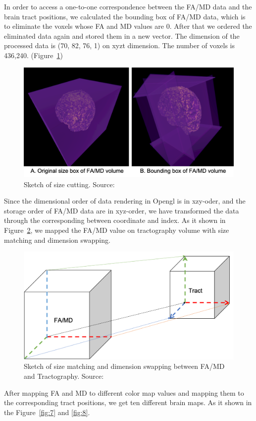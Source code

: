 \documentclass[a4paper, 12pt]{report}
\begin{document}
In order to access a one-to-one correspondence between the FA/MD data and the brain tract positions, we calculated the bounding box of FA/MD data, which is to eliminate the voxels whose FA and MD values are 0. After that we ordered the eliminated data again and stored them in a new vector. The dimension of the processed data is (70, 82, 76, 1) on xyzt dimension. The number of voxels is 436,240. (Figure~\ref{fig:5})

\begin{figure}[ht]
    \centering
    \includegraphics[width = 0.8\columnwidth]{5}
    \caption{Sketch of size cutting. Source:  \cite{???}}
    \label{fig:5}
\end{figure}	

Since the dimensional order of data rendering in Opengl is in xzy-oder, and the storage order of FA/MD data are in xyz-order, we have transformed the data through the corresponding between coordinate and index. As it shown in Figure~\ref{fig:6}, we mapped the FA/MD value on tractography volume with size matching and dimension swapping.

\begin{figure}[ht]
    \centering
    \includegraphics[width = 0.8\columnwidth]{6}
    \caption{Sketch of size matching and dimension swapping between FA/MD and Tractography. Source:  \cite{???}}
    \label{fig:6}
\end{figure}	

After mapping FA and MD to different color map values and mapping them to the corresponding tract positions, we get ten different brain maps. As it shown in the Figure~\ref{fig:7} and \ref{fig:8}.
\end{document}
